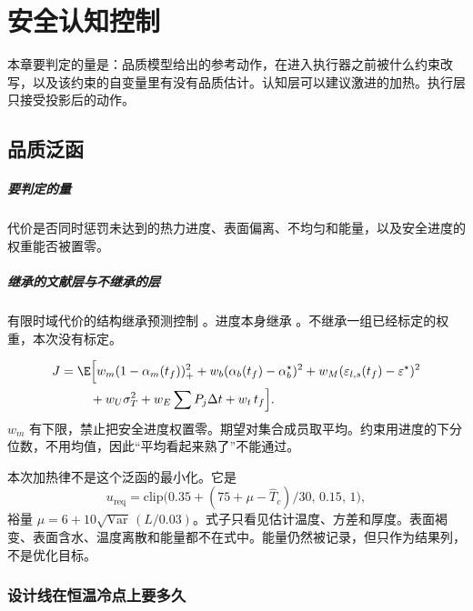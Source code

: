 \chapter{安全认知控制}
\label{ch:safe}

本章要判定的量是：品质模型给出的参考动作，在进入执行器之前被什么约束改写，以及该约束的自变量里有没有品质估计。认知层可以建议激进的加热。执行层只接受投影后的动作。

\section{品质泛函}

\paragraph{要判定的量}
代价是否同时惩罚未达到的热力进度、表面偏离、不均匀和能量，以及安全进度的权重能否被置零。

\paragraph{继承的文献层与不继承的层}
有限时域代价的结构继承预测控制 \cite{rawlings2017}。进度本身继承 \cite{holdsworth1997,vanboekel2008}。不继承一组已经标定的权重，本次没有标定。

\begin{equation}
\label{eq:J}
\begin{aligned}
J={}&\E\Big[
w_m(1-\alpha_m(t_f))_+^2
+w_b(\alpha_b(t_f)-\alpha_b^\star)^2
+w_M(\varepsilon_{l,s}(t_f)-\varepsilon^\star)^2\\
&\quad+w_U\sigma_T^2
+w_E\sum P_j\Delta t
+w_t\,t_f
\Big].
\end{aligned}
\end{equation}
\(w_m\) 有下限，禁止把安全进度权置零。期望对集合成员取平均。约束用进度的下分位数，不用均值，因此“平均看起来熟了”不能通过。

本次加热律不是这个泛函的最小化。它是
\begin{equation}
u_{\mathrm{req}}=\mathrm{clip}\big(0.35+(75+\mu-\hat T_c)/30,\,0.15,\,1\big),
\end{equation}
裕量 \(\mu=6+10\sqrt{\mathrm{Var}}\,(L/0.03)\)。式子只看见估计温度、方差和厚度。表面褐变、表面含水、温度离散和能量都不在式中。能量仍然被记录，但只作为结果列，不是优化目标。

\subsection{设计线在恒温冷点上要多久}


